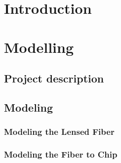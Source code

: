 
\chapter{Introduction}


%
%
%
%
%
%

\chapter{Modelling}

\newpage
\section{Project description}

\newpage
\section{Modeling}

\subsection{Modeling the Lensed Fiber}

\subsection{Modeling the Fiber to Chip}




